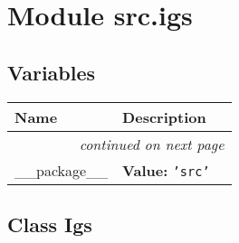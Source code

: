 %
%
%


\section{Module src.igs}

    \label{src:igs}


  \subsection{Variables}

    \vspace{-1cm}
\hspace{\varindent}\begin{longtable}{|p{\varnamewidth}|p{\vardescrwidth}|l}
\cline{1-2}
\cline{1-2} \centering \textbf{Name} & \centering \textbf{Description}& \\
\cline{1-2}
\endhead\cline{1-2}\multicolumn{3}{r}{\small\textit{continued on next page}}\\\endfoot\cline{1-2}
\endlastfoot\raggedright \_\-\_\-p\-a\-c\-k\-a\-g\-e\-\_\-\_\- & \raggedright \textbf{Value:} 
{\tt \texttt{'}\texttt{src}\texttt{'}}&\\
\cline{1-2}
\end{longtable}



\subsection{Class Igs}

